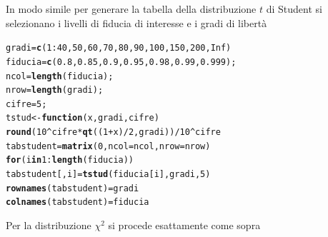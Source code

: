 \documentclass[onecolumn,12pt]{book}\usepackage[]{graphicx}\usepackage[]{color}
\makeatletter
\newcommand{\hlnum}[1]{\textcolor[rgb]{0.686,0.059,0.569}{#1}}%
\newcommand{\hlopt}[1]{\textcolor[rgb]{0,0,0}{#1}}%
\newcommand{\hlstd}[1]{\textcolor[rgb]{0.345,0.345,0.345}{#1}}%
\newcommand{\hlkwa}[1]{\textcolor[rgb]{0.161,0.373,0.58}{\textbf{#1}}}%
\newcommand{\hlkwb}[1]{\textcolor[rgb]{0.69,0.353,0.396}{#1}}%
\newcommand{\hlkwc}[1]{\textcolor[rgb]{0.333,0.667,0.333}{#1}}%
\newcommand{\hlkwd}[1]{\textcolor[rgb]{0.737,0.353,0.396}{\textbf{#1}}}%
\newenvironment{kframe}{%
 \def\at@end@of@kframe{}%
 \ifinner\ifhmode%
  \def\at@end@of@kframe{\end{minipage}}%
  \begin{minipage}{\columnwidth}%
 \fi\fi%
 \def\FrameCommand##1{\hskip\@totalleftmargin \hskip-\fboxsep
 \colorbox{shadecolor}{##1}\hskip-\fboxsep
     \hskip-\linewidth \hskip-\@totalleftmargin \hskip\columnwidth}%
 \MakeFramed {\advance\hsize-\width
   \@totalleftmargin\z@ \linewidth\hsize
   \@setminipage}}%
 {\par\unskip\endMakeFramed%
 \at@end@of@kframe}
\newenvironment{knitrout}{}{} %
\makeatother
\begin{document}
In modo simile per generare la tabella della distribuzione $t$ di Student si selezionano i livelli di fiducia di interesse e  i gradi di libert\`a
\begin{knitrout}
\color{fgcolor}\begin{kframe}
\begin{alltt}
\hlstd{gradi}\hlkwb{=}\hlkwd{c}\hlstd{(}\hlnum{1}\hlopt{:}\hlnum{40}\hlstd{,}\hlnum{50}\hlstd{,}\hlnum{60}\hlstd{,}\hlnum{70}\hlstd{,}\hlnum{80}\hlstd{,}\hlnum{90}\hlstd{,}\hlnum{100}\hlstd{,}\hlnum{150}\hlstd{,}\hlnum{200}\hlstd{,}\hlnum{Inf}\hlstd{)}
\hlstd{fiducia}\hlkwb{=}\hlkwd{c}\hlstd{(}\hlnum{0.8}\hlstd{,}\hlnum{0.85}\hlstd{,}\hlnum{0.9}\hlstd{,}\hlnum{0.95}\hlstd{,}\hlnum{0.98}\hlstd{,}\hlnum{0.99}\hlstd{,}\hlnum{0.999}\hlstd{);}
\hlstd{ncol}\hlkwb{=}\hlkwd{length}\hlstd{(fiducia);}
\hlstd{nrow}\hlkwb{=}\hlkwd{length}\hlstd{(gradi);}
\hlstd{cifre}\hlkwb{=}\hlnum{5}\hlstd{;}
\hlstd{tstud}\hlkwb{<-}\hlkwa{function}\hlstd{(}\hlkwc{x}\hlstd{,}\hlkwc{gradi}\hlstd{,}\hlkwc{cifre}\hlstd{)}
\hlkwd{round}\hlstd{(}\hlnum{10}\hlopt{^}\hlstd{cifre}\hlopt{*}\hlkwd{qt}\hlstd{((}\hlnum{1}\hlopt{+}\hlstd{x)}\hlopt{/}\hlnum{2}\hlstd{,gradi))}\hlopt{/}\hlnum{10}\hlopt{^}\hlstd{cifre}
\hlstd{tabstudent}\hlkwb{=}\hlkwd{matrix}\hlstd{(}\hlnum{0}\hlstd{,}\hlkwc{ncol}\hlstd{=ncol,}\hlkwc{nrow}\hlstd{=nrow)}
 \hlkwa{for} \hlstd{(i} \hlkwa{in} \hlnum{1}\hlopt{:}\hlkwd{length}\hlstd{(fiducia))}
 \hlstd{tabstudent[,i]}\hlkwb{=} \hlkwd{tstud}\hlstd{(fiducia[i],gradi,}\hlnum{5}\hlstd{)}
 \hlkwd{rownames}\hlstd{(tabstudent)}\hlkwb{=}\hlstd{gradi}
\hlkwd{colnames}\hlstd{(tabstudent)}\hlkwb{=}\hlstd{fiducia}
\end{alltt}
\end{kframe}
\end{knitrout}
 Per la distribuzione $\chi^2$ si procede esattamente come sopra
\end{document}
